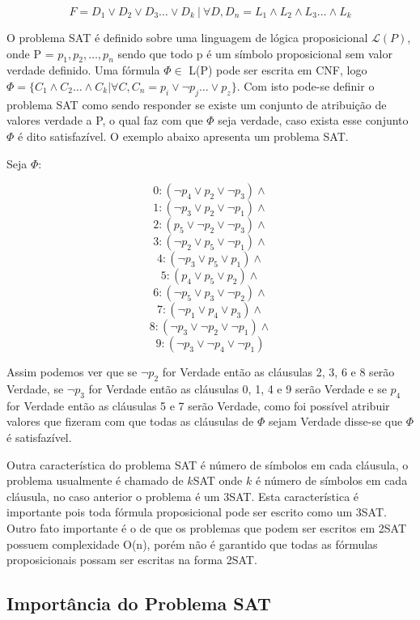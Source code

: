 \documentclass{ufsc-thesis}
\begin{document}
\begin{equation} \label{eq:DNF}
F = D_1\vee D_2\vee D_3 \dots \vee D_k\ |\ \forall D, D_n = L_1\wedge L_2 \wedge L_3 \dots \wedge L_k
\end{equation}

O problema SAT é definido sobre uma linguagem de lógica proposicional $\mathcal{L}(P)$, 
onde P = {$p_1,p_2,\dots,p_n$} sendo que todo p é um símbolo proposicional sem 
valor verdade definido. Uma fórmula $\Phi \in$ L(P) pode ser escrita em CNF, 
logo $\Phi = \{C_1\wedge C_2 \dots \wedge C_k | \forall C, C_n = p_i \vee \neg p_j \dots \vee p_z\}$.
Com isto pode-se definir o problema SAT como sendo responder se existe um 
conjunto de atribuição de valores verdade a P, o qual faz com que $\Phi$ 
seja verdade, caso exista esse conjunto $\Phi$ é dito satisfazível. O exemplo 
abaixo apresenta um problema SAT.

Seja $\Phi$:

$$0: (\neg p_4\vee p_2 \vee\neg p_3) \wedge $$
$$1: (\neg p_3\vee p_2 \vee\neg p_1) \wedge $$
$$2: ( p_5\vee\neg p_2 \vee\neg p_3) \wedge $$
$$3: (\neg p_2\vee p_5 \vee\neg p_1) \wedge $$
$$4: (\neg p_3\vee p_5 \vee p_1) \wedge $$
$$5: ( p_4\vee p_5 \vee p_2) \wedge $$
$$6: (\neg p_5\vee p_3 \vee\neg p_2) \wedge $$
$$7: (\neg p_1\vee p_4 \vee p_3) \wedge $$
$$8: (\neg p_3\vee\neg p_2 \vee\neg p_1) \wedge $$
$$9: (\neg p_3\vee\neg p_4 \vee\neg p_1) $$

Assim podemos ver que se $\neg p_2$ for Verdade então as cláusulas
2, 3, 6 e 8 serão Verdade, se $\neg p_3$ for Verdade então as cláusulas 
0, 1, 4 e 9 serão Verdade e se $p_4$ for Verdade então as cláusulas 
5 e 7 serão Verdade, como foi possível atribuir valores que fizeram com 
que todas as cláusulas de $\Phi$ sejam Verdade disse-se que $\Phi$ é satisfazível.

Outra característica do problema SAT é número de símbolos em cada cláusula,
o problema usualmente é chamado de $k$SAT onde $k$ é número de símbolos em cada 
cláusula, no caso anterior o problema é um 3SAT. Esta característica 
é importante pois toda fórmula proposicional pode ser escrito como um 3SAT. 
Outro fato importante é o de que os problemas que podem ser escritos em 
2SAT possuem complexidade O(n), porém não é garantido que todas as fórmulas proposicionais 
possam ser escritas na forma 2SAT\cite{Biere}.

\subsection{Importância do Problema SAT}
\label{sec:ipsat}
\end{document}
